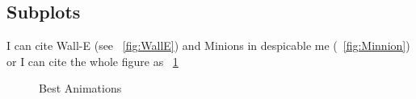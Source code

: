 \begin{landscape}

\section*{Subplots}
I can cite Wall-E (see ~\cref{fig:WallE}) and Minions in despicable me (~\cref{fig:Minnion}) or I can cite the whole figure as ~\cref{fig:animations}


\begin{figure}
  \centering
  \caption{Best Animations}
  \label{fig:animations}
\end{figure}


\end{landscape}
